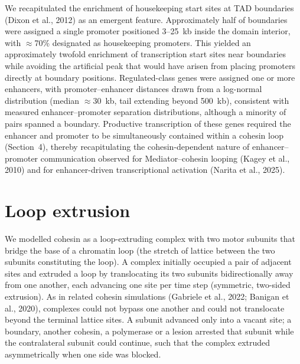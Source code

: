 \documentclass[11pt]{article}
\begin{document}
We recapitulated the enrichment of housekeeping start sites at TAD boundaries
(Dixon et al., 2012) as an emergent feature. Approximately half of boundaries were
assigned a single promoter positioned 3--25~kb inside the domain interior, with
$\approx$70\% designated as housekeeping promoters. This yielded an approximately
twofold enrichment of transcription start sites near boundaries while avoiding the
artificial peak that would have arisen from placing promoters directly at boundary
positions. Regulated-class genes were assigned one or more enhancers, with
promoter--enhancer distances drawn from a log-normal distribution (median
$\approx$30~kb, tail extending beyond 500~kb), consistent with measured
enhancer--promoter separation distributions, although a minority of pairs spanned a
boundary. Productive transcription of these genes required the enhancer and promoter
to be simultaneously contained within a cohesin loop (Section~4), thereby
recapitulating the cohesin-dependent nature of enhancer--promoter communication
observed for Mediator--cohesin looping (Kagey et al., 2010) and for enhancer-driven
transcriptional activation (Narita et al., 2025).

\section{Loop extrusion}

We modelled cohesin as a loop-extruding complex with two motor subunits that bridge
the base of a chromatin loop (the stretch of lattice between the two subunits
constituting the loop). A complex initially occupied a pair of adjacent sites and extruded a loop by translocating its two subunits bidirectionally away from one another, each advancing one site per time step 
(symmetric, two-sided extrusion). As in related cohesin simulations (Gabriele et
al., 2022; Banigan et al., 2020), complexes could not bypass one another and could
not translocate beyond the terminal lattice sites. A subunit advanced only into a
vacant site; a boundary, another cohesin, a polymerase or a lesion arrested that
subunit while the contralateral subunit could continue, such that the complex extruded
asymmetrically when one side was blocked.
\end{document}
